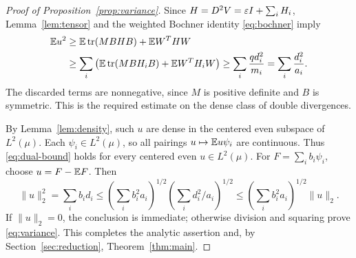 \begin{proof}[Proof of Proposition~\ref{prop:variance}]
Since $H=D^2V=\varepsilon I+\sum_iH_i$, Lemma~\ref{lem:tensor} and
the weighted Bochner identity \eqref{eq:bochner} imply
\begin{align}
 \mathbb E u^2
 &\ge\mathbb E\operatorname{tr}(MBHB)+\mathbb E W^THW\notag\\
 &\ge\sum_i\left(\mathbb E\operatorname{tr}(MBH_iB)+\mathbb E W^TH_iW\right)
 \ge\sum_i\frac{q d_i^2}{m_i}
 =\sum_i\frac{d_i^2}{a_i}.
 \label{eq:dual-bound}
\end{align}
The discarded terms are nonnegative, since $M$ is positive definite
and $B$ is symmetric. This is the required estimate on the dense
class of double divergences.

By Lemma~\ref{lem:density}, such $u$ are dense in the centered even
subspace of $L^2(\mu)$. Each $\psi_i\in L^2(\mu)$, so all pairings
$u\mapsto\mathbb E u\psi_i$ are continuous. Thus \eqref{eq:dual-bound}
holds for every centered even $u\in L^2(\mu)$.
For $F=\sum_i b_i\psi_i$, choose $u=F-\mathbb E F$. Then
\[
 \|u\|_2^2=\sum_i b_i d_i
 \le\left(\sum_i b_i^2a_i\right)^{1/2}
      \left(\sum_i d_i^2/a_i\right)^{1/2}
 \le\left(\sum_i b_i^2a_i\right)^{1/2}\|u\|_2.
\]
If $\|u\|_2=0$, the conclusion is immediate; otherwise division and
squaring prove \eqref{eq:variance}. This completes the analytic
assertion and, by Section~\ref{sec:reduction}, Theorem~\ref{thm:main}.
\end{proof}
